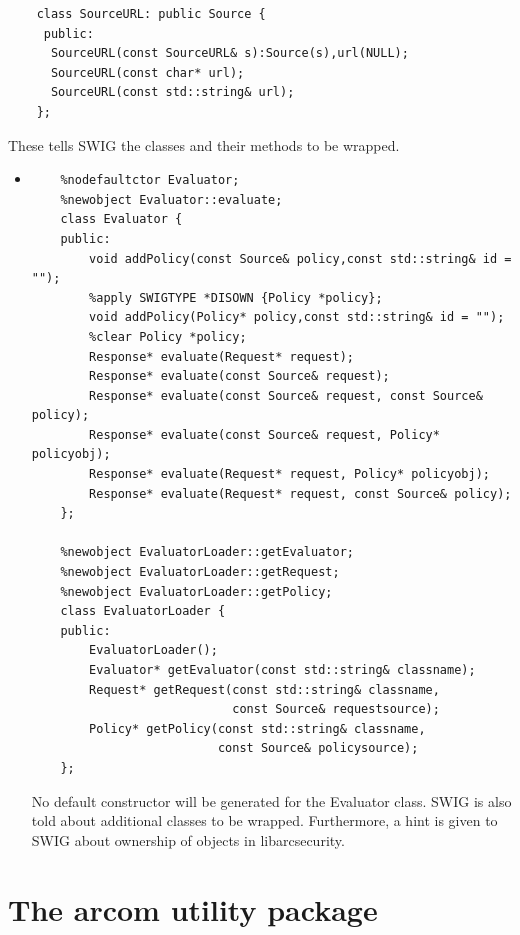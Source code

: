 \documentclass{article}
\begin{document}
\begin{flushleft}
\begin{itemize}
{\begin{verbatim}
    class SourceURL: public Source {
     public:
      SourceURL(const SourceURL& s):Source(s),url(NULL);
      SourceURL(const char* url);
      SourceURL(const std::string& url);
    };
  \end{verbatim}
  }
  These tells SWIG the classes and their methods to be wrapped.
\end{itemize}
\begin{itemize}
  \item{ \begin{verbatim}
    %nodefaultctor Evaluator;
    %newobject Evaluator::evaluate;
    class Evaluator {
    public:
        void addPolicy(const Source& policy,const std::string& id = "");
        %apply SWIGTYPE *DISOWN {Policy *policy};
        void addPolicy(Policy* policy,const std::string& id = "");
        %clear Policy *policy;
        Response* evaluate(Request* request);
        Response* evaluate(const Source& request);
        Response* evaluate(const Source& request, const Source& policy);
        Response* evaluate(const Source& request, Policy* policyobj);
        Response* evaluate(Request* request, Policy* policyobj);
        Response* evaluate(Request* request, const Source& policy);
    };

    %newobject EvaluatorLoader::getEvaluator;
    %newobject EvaluatorLoader::getRequest;
    %newobject EvaluatorLoader::getPolicy;
    class EvaluatorLoader {
    public:
        EvaluatorLoader();
        Evaluator* getEvaluator(const std::string& classname);
        Request* getRequest(const std::string& classname, 
                            const Source& requestsource);
        Policy* getPolicy(const std::string& classname, 
                          const Source& policysource);
    };
  \end{verbatim}
  No default constructor will be generated for the Evaluator class. \linebreak
  SWIG is also told about additional classes to be wrapped. 
  Furthermore, a hint is given to SWIG about ownership of objects in libarcsecurity.
  }
\end{itemize}
\end{flushleft}

\newpage

\section{The arcom utility package}
\end{document}

